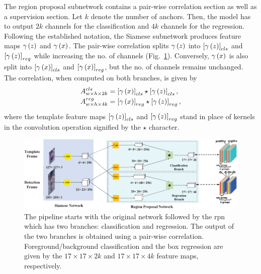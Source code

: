 The region proposal subnetwork contains a pair-wise correlation section as well as a supervision section. Let $k$ denote the number of anchors. Then, the model has to output $2k$ channels for the classification and $4k$ channels for the regression. Following the established notation, the Siamese subnetwork produces feature maps ${\gamma} \left( z \right)$ and ${\gamma} \left( x \right)$. The pair-wise correlation splits ${\gamma} \left( z \right)$ into $\left[ {{\gamma} \left( z \right)} \right]_{cls}$ and $\left[ {{\gamma} \left( z \right)} \right]_{reg}$ while increasing the no. of channels (Fig.~\ref{fig:SiamRPNNetArchitecture}). Conversely, ${\gamma} \left( x \right)$ is also split into $\left[ {{\gamma} \left( x \right)} \right]_{cls}$ and $\left[ {{\gamma} \left( x \right)} \right]_{reg}$, but the no. of channels remains unchanged. The correlation, when computed on both branches, is given by
\begin{equation}
    \begin{aligned}
        {A}_{w \times h \times 2k}^{cls} & =
        \left[ {{\gamma} \left( x \right)} \right]_{cls} \star \left[ {{\gamma} \left( z \right)} \right]_{cls}, \\
        {A}_{w \times h \times 4k}^{reg} & =
        \left[ {{\gamma} \left( x \right)} \right]_{reg} \star \left[ {{\gamma} \left( z \right)} \right]_{reg},
    \end{aligned}
\end{equation}
where the template feature maps $\left[ {{\gamma} \left( z \right)} \right]_{cls}$ and $\left[ {{\gamma} \left( z \right)} \right]_{reg}$ stand in place of kernels in the convolution operation signified by the $\star$ character.

\begin{figure}[t]
    \centerline{\includegraphics[width=\linewidth]{figures/theoretical_foundations/siam_rpn_architecture.pdf}}
    \caption[ architecture]{The pipeline starts with the original  network followed by the \gls{rpn} which has two branches: classification and regression. The output of the two branches is obtained using a pair-wise correlation. Foreground/background classification and the box regression are given by the $17 \times 17 \times 2k$ and $17 \times 17 \times 4k$ feature maps, respectively. }
    \label{fig:SiamRPNNetArchitecture}
\end{figure}

